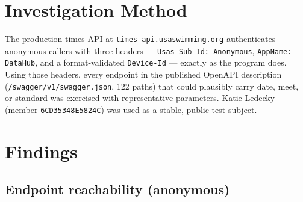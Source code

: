 \documentclass[12pt]{article}
\newcommand{\code}[1]{\texttt{#1}}
\begin{document}
\section{Investigation Method}

The production times API at \code{times-api.usaswimming.org} authenticates
anonymous callers with three headers --- \code{Usas-Sub-Id: Anonymous},
\code{AppName: DataHub}, and a format-validated \code{Device-Id} --- exactly
as the program does. Using those headers, every endpoint in the published
OpenAPI description (\code{/swagger/v1/swagger.json}, 122 paths) that could
plausibly carry date, meet, or standard was exercised with representative
parameters. Katie Ledecky (member \code{6CD35348E5824C}) was used as a
stable, public test subject.

\section{Findings}

\subsection{Endpoint reachability (anonymous)}
\end{document}

